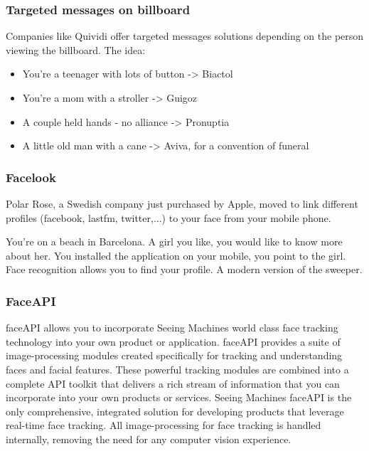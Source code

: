 \subsubsection*{Targeted messages on billboard}
Companies like Quividi offer targeted messages solutions depending on the person viewing the billboard. The idea:
\begin{itemize}
\item You're a teenager with lots of button -> Biactol
\item You're a mom with a stroller -> Guigoz
\item A couple held hands - no alliance -> Pronuptia
\item A little old man with a cane -> Aviva, for a convention of funeral
\end{itemize}

\subsubsection*{Facelook}
Polar Rose, a Swedish company just purchased by Apple, moved to link different profiles (facebook, lastfm, twitter,...) to your face from your mobile phone.

You're on a beach in Barcelona.
A girl you like, you would like to know more about her.
You installed the application on your mobile, you point to the girl.
Face recognition allows you to find your profile.
A modern version of the sweeper.

\subsubsection*{FaceAPI}
faceAPI allows you to incorporate Seeing Machines world class face tracking technology into your own product or application. faceAPI provides a suite of image-processing modules created specifically for tracking and understanding faces and facial features. These powerful tracking modules are combined into a complete API toolkit that delivers a rich stream of information that you can incorporate into your own products or services. Seeing Machines faceAPI is the only comprehensive, integrated solution for developing products that leverage real-time face tracking. All image-processing for face tracking is handled internally, removing the need for any computer vision experience.
